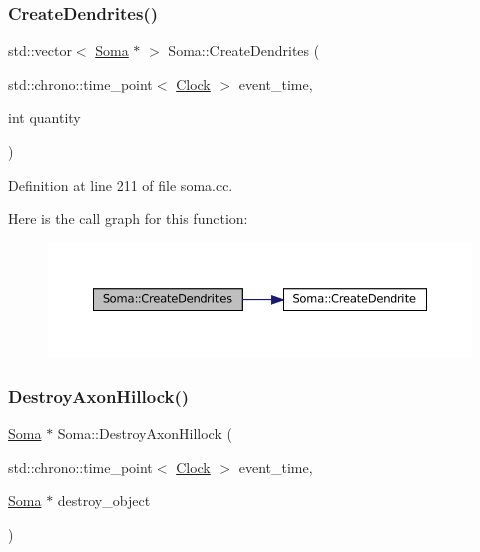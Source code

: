 \subsubsection{\texorpdfstring{Create\+Dendrites()}{CreateDendrites()}}
{\footnotesize\ttfamily std\+::vector$<$ \mbox{\hyperlink{class_soma}{Soma}} $\ast$ $>$ Soma\+::\+Create\+Dendrites (\begin{DoxyParamCaption}\item[{std\+::chrono\+::time\+\_\+point$<$ \mbox{\hyperlink{universe_8h_a0ef8d951d1ca5ab3cfaf7ab4c7a6fd80}{Clock}} $>$}]{event\+\_\+time,  }\item[{int}]{quantity }\end{DoxyParamCaption})}



Definition at line 211 of file soma.\+cc.

Here is the call graph for this function\+:\nopagebreak
\begin{figure}[H]
\begin{center}
\leavevmode
\includegraphics[width=350pt]{class_soma_a68dc02eff2912ad045900ab1879f020e_cgraph}
\end{center}
\end{figure}
\mbox{\label{class_soma_af6d6d3e3c94f06682cf05a7a72032a46}} 
\subsubsection{\texorpdfstring{Destroy\+Axon\+Hillock()}{DestroyAxonHillock()}}
{\footnotesize\ttfamily \mbox{\hyperlink{class_soma}{Soma}} $\ast$ Soma\+::\+Destroy\+Axon\+Hillock (\begin{DoxyParamCaption}\item[{std\+::chrono\+::time\+\_\+point$<$ \mbox{\hyperlink{universe_8h_a0ef8d951d1ca5ab3cfaf7ab4c7a6fd80}{Clock}} $>$}]{event\+\_\+time,  }\item[{\mbox{\hyperlink{class_soma}{Soma}} $\ast$}]{destroy\+\_\+object }\end{DoxyParamCaption})}



